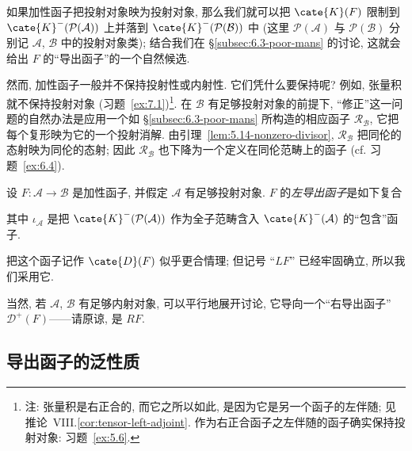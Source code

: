如果加性函子把投射对象映为投射对象, 那么我们就可以把 $\cate{K}(F)$ 限制到 $\cate{K}^-(\mathcal{P}(\mathcal{A}))$ 上并落到 $\cate{K}^-(\mathcal{P}(\mathcal{B}))$ 中 (这里 $\mathcal{P}(\mathcal{A})$ 与 $\mathcal{P}(\mathcal{B})$ 分别记 $\mathcal{A}$, $\mathcal{B}$ 中的投射对象类); 结合我们在 \S\ref{subsec:6.3-poor-mans} 的讨论, 这就会给出 $F$ 的``导出函子''的一个自然候选.

然而, 加性函子一般并不保持投射性或内射性. 它们凭什么要保持呢? 例如, 张量积就不保持投射对象 (习题~\ref{ex:7.1})\footnote{注: 张量积是右正合的, 而它之所以如此, 是因为它是另一个函子的左伴随; 见推论~VIII.\ref{cor:tensor-left-adjoint}. 作为右正合函子之左伴随的函子确实保持投射对象: 习题~\ref{ex:5.6}.}. 在 $\mathcal{B}$ 有足够投射对象的前提下, ``修正''这一问题的自然办法是应用一个如 \S\ref{subsec:6.3-poor-mans} 所构造的相应函子 $\mathcal{R}_{\mathcal{B}}$, 它把每个复形映为它的一个投射消解. 由引理~\ref{lem:5.14-nonzero-divisor}, $\mathcal{R}_{\mathcal{B}}$ 把同伦的态射映为同伦的态射; 因此 $\mathcal{R}_{\mathcal{B}}$ 也下降为一个定义在同伦范畴上的函子 (cf. 习题~\ref{ex:6.4}).

\begin{definition}\label{def:7.1-left-derived}
设 $F:\mathcal{A}\to\mathcal{B}$ 是加性函子, 并假定 $\mathcal{A}$ 有足够投射对象. $F$ 的\emph{左导出函子}是如下复合
\begin{center}
\end{center}
其中 $\iota_{\mathcal{A}}$ 是把 $\cate{K}^-(\mathcal{P}(\mathcal{A}))$ 作为全子范畴含入 $\cate{K}^-(\mathcal{A})$ 的``包含''函子.
\end{definition}

把这个函子记作 $\cate{D}(F)$ 似乎更合情理; 但记号 ``$L F$'' 已经牢固确立, 所以我们采用它.

当然, 若 $\mathcal{A}$, $\mathcal{B}$ 有足够内射对象, 可以平行地展开讨论, 它导向一个``右导出函子'' $\mathcal{D}^+(F)$——请原谅, 是 $R F$.

\subsection{导出函子的泛性质}
\label{subsec:7.2-universal}

